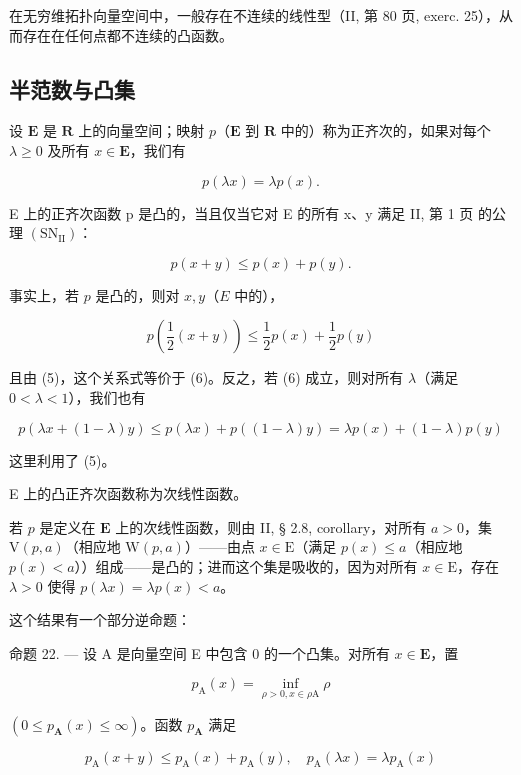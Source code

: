 在无穷维拓扑向量空间中，一般存在不连续的线性型（II, 第 80 页, exerc. 25），从而存在在任何点都不连续的凸函数。

\subsection{半范数与凸集}

设 \(\mathbf{E}\) 是 \(\mathbf{R}\) 上的向量空间；映射 \(p\)（\(\mathbf{E}\) 到 \(\mathbf{R}\) 中的）称为正齐次的，如果对每个 \(\lambda \geqslant 0\) 及所有 \(x \in \mathbf{E}\)，我们有

\[
p (\lambda x) = \lambda p (x).\tag{5}
\]

E 上的正齐次函数 p 是凸的，当且仅当它对 E 的所有 x、y 满足 II, 第 1 页 的公理 \((\mathrm{SN}_{\mathrm{II}})\)：

\[
p (x + y) \leqslant p (x) + p (y).\tag{6}
\]

事实上，若 \(p\) 是凸的，则对 \(x, y\)（\(E\) 中的），

\[
p \left(\frac {1}{2} (x + y)\right) \leqslant \frac {1}{2} p (x) + \frac {1}{2} p (y)
\]

且由 (5)，这个关系式等价于 (6)。反之，若 (6) 成立，则对所有 \(\lambda\)（满足 \(0 < \lambda < 1\)），我们也有

\[
p (\lambda x + (1 - \lambda) y) \leqslant p (\lambda x) + p ((1 - \lambda) y) = \lambda p (x) + (1 - \lambda) p (y)
\]

这里利用了 (5)。

E 上的凸正齐次函数称为次线性函数。

若 \(p\) 是定义在 \(\mathbf{E}\) 上的次线性函数，则由 II, § 2.8, corollary，对所有 \(a > 0\)，集 \(\mathrm{V}(p, a)\)（相应地 \(\mathrm{W}(p, a)\)）——由点 \(x \in \mathrm{E}\)（满足 \(p(x) \leqslant a\)（相应地 \(p(x) < a\)））组成——是凸的；进而这个集是吸收的，因为对所有 \(x \in \mathrm{E}\)，存在 \(\lambda > 0\) 使得 \(p(\lambda x) = \lambda p(x) < a\)。

这个结果有一个部分逆命题：

命题 22. --- 设 A 是向量空间 E 中包含 0 的一个凸集。对所有 \(x \in \mathbf{E}\)，置

\[
p _ {\mathrm{A}} (x) = \inf _ {\rho > 0, x \in \rho \mathrm{A}} \rho\tag{7}
\]

\((0 \leqslant p_{\mathbf{A}}(x) \leqslant \infty)\)。函数 \(p_{\mathbf{A}}\) 满足

\[
p _ {\mathrm{A}} (x + y) \leqslant p _ {\mathrm{A}} (x) + p _ {\mathrm{A}} (y), \quad p _ {\mathrm{A}} (\lambda x) = \lambda p _ {\mathrm{A}} (x)\tag{8}
\]


